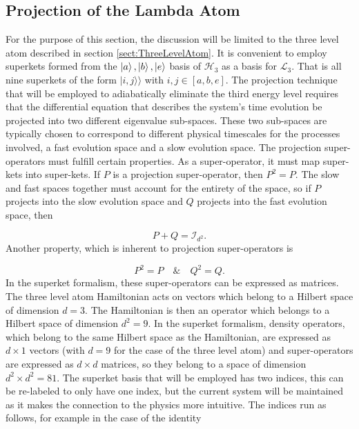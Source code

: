 \documentclass[12pt]{article}
\newcommand{\superket}[1]{|#1\rangle\rangle}
\begin{document}
\subsection{Projection of the Lambda Atom}

For the purpose of this section, the discussion will be limited to the three level atom described in section \ref{sect:ThreeLevelAtom}. It is convenient to employ superkets formed from the $\ket{a},\ket{b},\ket{e}$ basis of $\mathcal{H}_3$ as a basis for $\mathcal{L}_3$. That is all nine superkets of the form $\superket{i,j}$ with $i, j \in [a,b,e]$. The projection technique that will be employed to adiabatically eliminate the third energy level requires that the differential equation that describes the system's time evolution be projected into two different eigenvalue sub-spaces. These two sub-spaces are typically chosen to correspond to different physical timescales for the processes involved, a fast evolution space and a slow evolution space. The projection super-operators must fulfill certain properties. As a super-operator, it must map super-kets into super-kets. If $P$ is a projection super-operator, then $P^2 = P$. The slow and fast spaces together must account for the entirety of the space, so if $P$ projects into the slow evolution space and $Q$ projects into the fast evolution space, then

\begin{equation}\label{eq:ProyectorPropertyIdentity}
    P+Q = \mathcal{I}_{d^2}.
\end{equation} Another property, which is inherent to projection super-operators is

\begin{equation}
    P^2 = P \quad \& \quad Q^2 = Q.
\end{equation} In the superket formalism, these super-operators can be expressed as matrices. The three level atom Hamiltonian acts on vectors which belong to a Hilbert space of dimension $d = 3$. The Hamiltonian is then an operator which belongs to a Hilbert space of dimension $d^2 = 9$. In the superket formalism, density operators, which belong to the same Hilbert space as the Hamiltonian, are expressed as $d \times 1$ vectors (with $d=9$ for the case of the three level atom) and super-operators are expressed as $d \times d$ matrices, so they belong to a space of dimension $d^2 \times d^2 = 81$. The superket basis that will be employed has two indices, this can be re-labeled to only have one index, but the current system will be maintained as it makes the connection to the physics more intuitive. The indices run as follows, for example in the case of the identity
\end{document}
